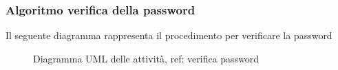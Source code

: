 \subsubsection{Algoritmo verifica della password}
Il seguente diagramma rappresenta il procedimento per verificare la password
\vspace{0.5cm}
\begin{figure}[H]
    \centering
    \caption{Diagramma UML delle attività, ref: verifica password}
    \label{fig:activity_user_password}
\end{figure}